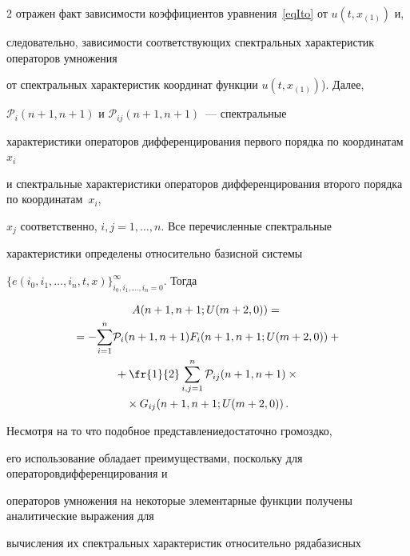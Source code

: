 \begin{multicols}{2}
отражен факт зависимости коэффициентов уравнения~\eqref{eqIto} от $u(t,x_{(1)})$ и, 


следовательно, зависимости соответствующих спект\-раль\-ных характеристик операторов умножения 


от спектральных характеристик координат функции $u(t,x_{(1)})$). Далее, 


${\mathcal{P}_i(n+1,n+1)}$ и ${\mathcal{P}_{ij}(n+1,n+1)}$~--- спектральные 


характеристики операторов дифференцирования первого порядка по координатам~$x_i$ 


и спектральные характеристики операторов дифференцирования второго порядка по координатам~$x_i$, 


$x_j$ соответственно, ${i,j = 1,\dots,n}$. Все перечисленные спектральные 


характеристики определены относительно базисной сис\-те\-мы 


${\{e(i_0,i_1,\dots,i_n,t,x)\}_{i_0,i_1,\dots,i_n = 0}^\infty}$. Тогда~\cite{PanRybSot, PanRyb}


\begin{multline}


\label{eqSpA}


  A(n+1,n+1; U(m+2,0)) ={} \\


{}  = - {\sum\limits_{i = 1}^n} \mathcal{P}_i(n+1,n+1)  F_i(n+1,n+1; U(m+2,0)) +{} \\


{}  + \fr{1}{2} \sum\limits_{i,j = 1}^n \mathcal{P}_{ij}(n+1,n+1) \times{}\\


{}\times 


G_{ij}(n+1,n+1; U(m+2,0))\,.


\end{multline}





Несмотря на то что подобное представление\linebreak достаточно громоздко, 


его использование обладает преимуществами, поскольку для операторов\linebreak дифферен\-цирования и 


операторов умножения на некоторые элементарные функции получены аналити\-ческие выражения для 


вычисления их спект\-раль\-ных характеристик относительно ряда\linebreak базисных 



\end{multicols}
